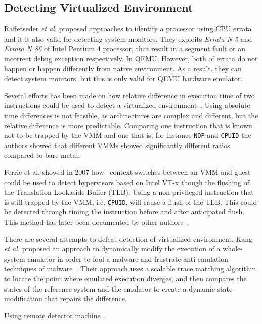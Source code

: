 \subsection{Detecting Virtualized Environment}
Raffetseder \textit{et al.} proposed approaches to identify a processor 
using CPU errata~\cite{raffetseder2007} and it is also valid for detecting system monitors. 
They exploits \textit{Errata N 5} and \textit{Errata N 86} of Intel Pentium 4 processor, 
that result in a segment fault or an incorrect debug exception respectively. 
In QEMU, However, both of errata do not happen or happen differently from native environment. 
As a result, they can detect system monitors, but this is only valid for QEMU hardware emulator.

Several efforts has been made on how relative difference in execution time of
two instructions could be used to detect a virtualized
environment~\cite{raffetseder2007, thompson}. Using absolute time differences is
not feasible, as architectures are complex and different, but the relative
difference is more predictable. Comparing one instruction that is known not to
be trapped by the VMM and one that is, for instance {\tt NOP} and {\tt CPUID}
the authors showed that different VMMs showed significantly different ratios
compared to bare metal.

Ferrie {et al.} showed in 2007 how~\cite{ferrie2007} context switches between an
VMM and guest could be used to detect hypervisors based on Intel VT-x though the
flushing of the Translation Lookaside Buffer (TLB). Using a non-privileged
instruction that is still trapped by the VMM, i.e. {\tt CPUID}, will cause a
flush of the TLB. This could be detected through timing the instruction before
and after anticipated flush. This method has later been documented by other
authors~\cite{thompson}.

There are several attempts to defeat detection of virtualized environment. 
Kang \textit{et al.} proposed an approach to dynamically modify the execution of 
a whole-system emulator in order to fool a malware and frustrate anti-emulation techniques 
of malware~\cite{kang2009}. Their approach uses a scalable trace matching algorithm to locate 
the point where emulated execution diverges, and then compares the states of the reference system
 and the emulator to create a dynamic state modification that repairs the difference. 

Using remote detector machine~\cite{franklin2008}.

